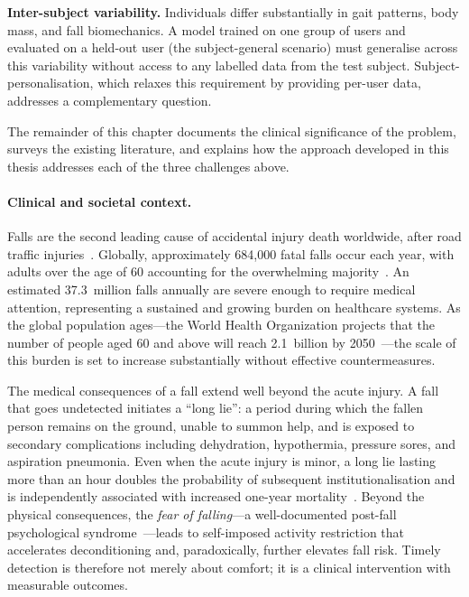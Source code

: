\documentclass[onluarkali,ingilizce,yukseklisans,karton,LisansustuEgitim]{itutez}
\providecommand{\1}{\mathbf{1}}
\begin{document}
\textbf{Inter-subject variability.} Individuals differ substantially in gait patterns, body mass, and fall biomechanics. A model trained on one group of users and evaluated on a held-out user (the subject-general scenario) must generalise across this variability without access to any labelled data from the test subject. Subject-personalisation, which relaxes this requirement by providing per-user data, addresses a complementary question.

The remainder of this chapter documents the clinical significance of the problem, surveys the existing literature, and explains how the approach developed in this thesis addresses each of the three challenges above.

\paragraph{Clinical and societal context.}
Falls are the second leading cause of accidental injury death worldwide, after road
traffic injuries~\parencite{who2021falls}.  Globally, approximately 684,000 fatal falls
occur each year, with adults over the age of 60 accounting for the overwhelming
majority~\parencite{who2021falls}.  An estimated 37.3~million falls annually are severe
enough to require medical attention, representing a sustained and growing burden on
healthcare systems.  As the global population ages---the World Health Organization
projects that the number of people aged 60 and above will reach 2.1~billion by
2050~\parencite{who2022ageing}---the scale of this burden is set to increase substantially
without effective countermeasures.

The medical consequences of a fall extend well beyond the acute injury.  A fall that
goes undetected initiates a ``long lie'': a period during which the fallen person
remains on the ground, unable to summon help, and is exposed to secondary complications
including dehydration, hypothermia, pressure sores, and aspiration pneumonia.  Even
when the acute injury is minor, a long lie lasting more than an hour doubles the
probability of subsequent institutionalisation and is independently associated with
increased one-year mortality~\parencite{wild1981longlie}.  Beyond the physical consequences,
the \emph{fear of falling}---a well-documented post-fall psychological
syndrome~\parencite{tinetti1988fear}---leads to self-imposed activity restriction that
accelerates deconditioning and, paradoxically, further elevates fall risk.  Timely
detection is therefore not merely about comfort; it is a clinical intervention with
measurable outcomes.
\end{document}
